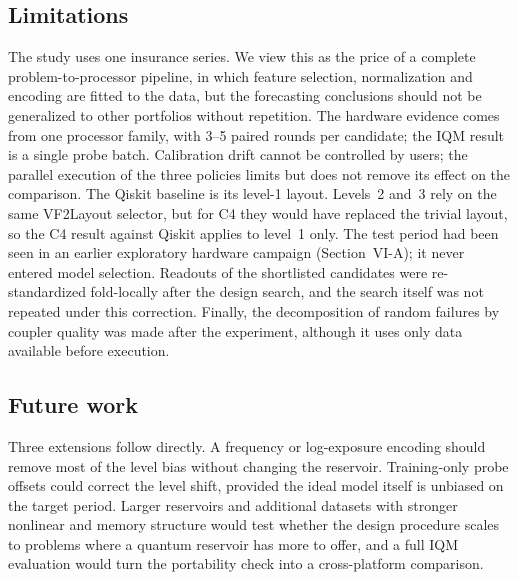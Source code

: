 \documentclass[journal]{IEEEtran}
\begin{document}
\subsection{Limitations}
The study uses one insurance series. We view this as the price of a complete problem-to-processor pipeline, in which feature selection, normalization and encoding are fitted to the data, but the forecasting conclusions should not be generalized to other portfolios without repetition. The hardware evidence comes from one processor family, with 3--5 paired rounds per candidate; the IQM result is a single probe batch. Calibration drift cannot be controlled by users; the parallel execution of the three policies limits but does not remove its effect on the comparison. The Qiskit baseline is its level-1 layout. Levels~2 and~3 rely on the same VF2Layout selector, but for C4 they would have replaced the trivial layout, so the C4 result against Qiskit applies to level~1 only. The test period had been seen in an earlier exploratory hardware campaign (Section~VI-A); it never entered model selection. Readouts of the shortlisted candidates were re-standardized fold-locally after the design search, and the search itself was not repeated under this correction. Finally, the decomposition of random failures by coupler quality was made after the experiment, although it uses only data available before execution.

\subsection{Future work}
Three extensions follow directly. A frequency or log-exposure encoding should remove most of the level bias without changing the reservoir. Training-only probe offsets could correct the level shift, provided the ideal model itself is unbiased on the target period. Larger reservoirs and additional datasets with stronger nonlinear and memory structure would test whether the design procedure scales to problems where a quantum reservoir has more to offer, and a full IQM evaluation would turn the portability check into a cross-platform comparison.
\end{document}
